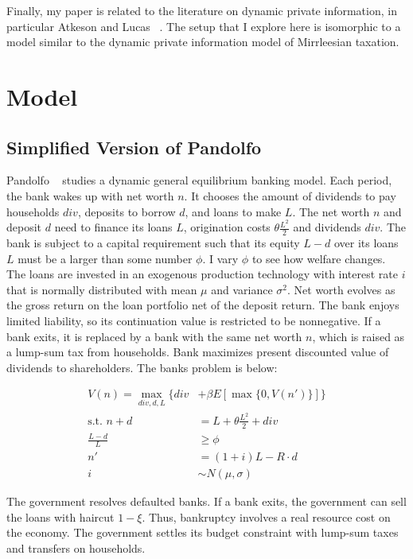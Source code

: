 \documentclass[12pt]{article}
\begin{document}
\pagebreak

Finally, my paper is related to the literature on dynamic private information, in particular Atkeson and Lucas ~\cite{atkeson_lucas_1992}.  The setup that I explore here is isomorphic to a model similar to the dynamic private information model of Mirrleesian taxation.

\section{Model}

\subsection{Simplified Version of Pandolfo ~\cite{pandolfo_2021}}

Pandolfo ~\cite{pandolfo_2021} studies a dynamic general equilibrium banking model. Each period, the bank wakes up with net worth $n$.  It chooses the amount of dividends to pay households $div$, deposits to borrow $d$, and loans to make $L$.  The net worth $n$ and deposit $d$ need to finance its loans $L$, origination costs $\theta \frac{L^2}{2}$ and dividends $div$.  The bank is subject to a capital requirement such that its equity $L - d$ over its loans $L$ must be a larger than some number $\phi$.  I vary $\phi$ to see how welfare changes. The loans are invested in an exogenous production technology with interest rate $i$ that is normally distributed with mean $\mu$ and variance $\sigma^2$.  Net worth evolves as the gross return on the loan portfolio net of the deposit return.  The bank enjoys limited liability, so its continuation value is restricted to be nonnegative. If a bank exits, it is replaced by a bank with the same net worth $n$, which is raised as a lump-sum tax from households. Bank maximizes present discounted value of dividends to shareholders. The banks problem is below:

\begin{align*}
V(n) = \max_{div, d, L} \Big\{ div &+ \beta E [\max\{0, V(n')\}]\Big\} \\
\text{s.t. } 
n + d &= L + \theta \frac{L^2}{2} + div\\
\frac{L - d}{L} & \ge \phi\\
n' &= (1 + i)L - R \cdot d \\
i &\sim N(\mu,\sigma)
\end{align*}

The government resolves defaulted banks. If a bank exits, the government can sell the loans with haircut $1 - \xi$.  Thus, bankruptcy involves a real resource cost on the economy.  The government settles its budget constraint with lump-sum taxes and transfers on households.
\end{document}
